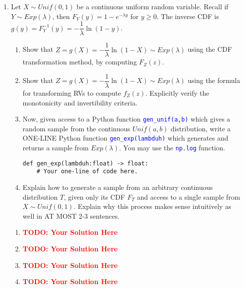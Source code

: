 \documentclass[12pt]{article}
\def\code#1{\textcolor{blue}{\texttt{#1}}}
\def\todo#1{\textcolor{red}{\textbf{#1}}}
\renewcommand{\|}{\mid}
\begin{document}
\begin{enumerate}
\item Let $X\sim Unif(0,1)$ be a continuous uniform random variable. Recall if $Y\sim Exp(\lambda)$, then $F_Y(y)=1-e^{-\lambda y}$ for $y\ge 0$. The inverse CDF is $g(y)=F_Y^{-1}(y)=-\dfrac{1}{\lambda}\ln{(1-y)}$.
\begin{enumerate}
    \item Show that $Z=g(X)=-\dfrac{1}{\lambda}\ln{(1-X)}\sim Exp(\lambda)$ using the CDF transformation method, by computing $F_Z(z)$.
    \item Show that $Z=g(X)=-\dfrac{1}{\lambda}\ln{(1-X)}\sim Exp(\lambda)$ using the formula for transforming RVs to compute $f_Z(z)$. Explicitly verify the monotonicity and invertibility criteria.
    \item Now, given access to a Python function \code{gen\_unif(a,b)} which gives a random sample from the continuous $Unif(a,b)$ distribution, write a ONE-LINE Python function \code{gen\_exp(lambduh)} which generates and returns a sample from $Exp(\lambda)$. You may use the \code{np.log} function.
\begin{verbatim}
def gen_exp(lambduh:float) -> float:
    # Your one-line of code here.
\end{verbatim}
    \item Explain how to generate a sample from an arbitrary continuous distribution $T$, given only its CDF $F_T$ and access to a single sample from $X\sim Unif(0,1)$. Explain why this process makes sense intuitively as well in AT MOST 2-3 sentences.
\end{enumerate}

\begin{tcolorbox}
\begin{enumerate}
\item \todo{TODO: Your Solution Here}
\item \todo{TODO: Your Solution Here}
\item \todo{TODO: Your Solution Here}
\item \todo{TODO: Your Solution Here}
\end{enumerate}
\end{tcolorbox}


\end{enumerate}
\end{document}
